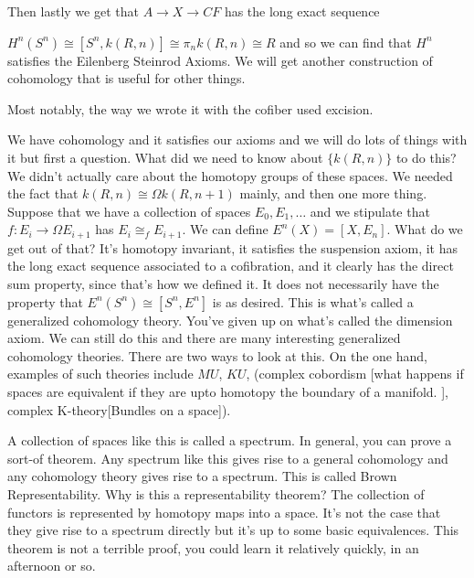 \documentclass[12pt]{article}
\theoremstyle{definition}
\begin{document}
	Then lastly we get that $A\to X\to CF$ has the long exact sequence \begin{center}
	\end{center}
	
	$H^n(S^n)\cong [S^n,k(R,n)]\cong \pi_n k(R,n)\cong R$ and so we can find that $H^n$ satisfies the Eilenberg Steinrod Axioms. We will get another construction of cohomology that is useful for other things.
	
	Most notably, the way we wrote it with the cofiber used excision. 
	
	We have cohomology and it satisfies our axioms and we will do lots of things with it but first a question. What did we need to know about $\{k(R,n)\}$ to do this? We didn't actually care about the homotopy groups of these spaces. We needed the fact that $k(R,n)\cong \Omega k(R,n+1)$ mainly, and then one more thing. Suppose that we have a collection of spaces  $E_0, E_1,\dots $ and we stipulate that $f:E_i\to \Omega E_{i+1}$ has $E_i\cong_f E_{i+1}$. We can define $E^n(X)=[X,E_n]$. What do we get out of that? It's homotopy invariant, it satisfies the suspension axiom, it has the long exact sequence associated to a cofibration, and it clearly has the direct sum property, since that's how we defined it. It does not necessarily have the property that $E^n(S^n)\cong [S^n, E^n]$ is as desired. This is what's called a generalized cohomology theory. You've given up on what's called the dimension axiom. We can still do this and there are many interesting generalized cohomology theories. There are two ways to look at this. On the one hand, examples of such theories include $MU$, $KU$, (complex cobordism [what happens if spaces are equivalent if they are upto homotopy the boundary of a manifold. ], complex K-theory[Bundles on a space]). 
	
	A collection of spaces like this is called a spectrum. In general, you can prove a sort-of theorem. Any spectrum like this gives rise to a general cohomology and any cohomology theory gives rise to a spectrum. This is called Brown Representability. Why is this a representability theorem? The collection of functors is represented by homotopy maps into a space. It's not the case that they give rise to a spectrum directly but it's up to some basic equivalences. This theorem is not a terrible proof, you could learn it relatively quickly, in an afternoon or so. 
	
\end{document}
